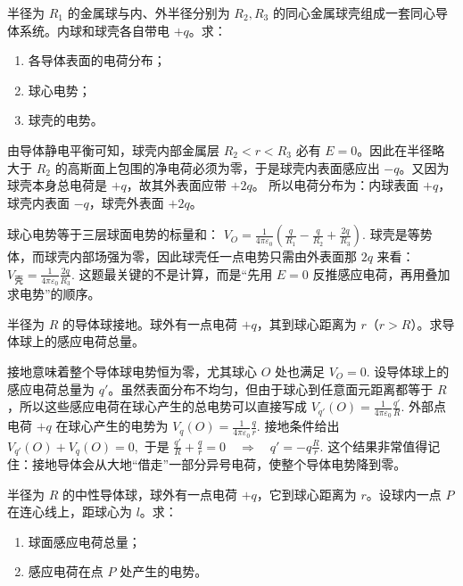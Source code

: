 \documentclass[lang=cn,11pt]{elegantbook}
\begin{document}
\begin{exercise}[同心金属球与金属球壳的电荷分布和电势]
半径为 \(R_1\) 的金属球与内、外半径分别为 \(R_2,R_3\) 的同心金属球壳组成一套同心导体系统。内球和球壳各自带电 \(+q\)。求：
\begin{enumerate}
 \item 各导体表面的电荷分布；
 \item 球心电势；
 \item 球壳的电势。
\end{enumerate}
\end{exercise}

\begin{solution}
由导体静电平衡可知，球壳内部金属层 \(R_2<r<R_3\) 必有 \(E=0\)。因此在半径略大于 \(R_2\) 的高斯面上包围的净电荷必须为零，于是球壳内表面感应出
\(-q\)。又因为球壳本身总电荷是 \(+q\)，故其外表面应带 \(+2q\)。
所以电荷分布为：内球表面 \(+q\)，球壳内表面 \(-q\)，球壳外表面 \(+2q\)。

球心电势等于三层球面电势的标量和：
 \(V_O=\frac{1}{4\pi\varepsilon_0}\left( \frac{q}{R_1}-\frac{q}{R_2}+\frac{2q}{R_3} \right).\) 
球壳是等势体，而球壳内部场强为零，因此球壳任一点电势只需由外表面那 \(2q\) 来看：
 \(V_{\text{壳}}=\frac{1}{4\pi\varepsilon_0}\frac{2q}{R_3}.\) 
这题最关键的不是计算，而是“先用 \(E=0\) 反推感应电荷，再用叠加求电势”的顺序。
\end{solution}

\begin{exercise}[接地导体球附近点电荷诱导出的总电荷]
半径为 \(R\) 的导体球接地。球外有一点电荷 \(+q\)，其到球心距离为 \(r\)（\(r>R\)）。求导体球上的感应电荷总量。
\end{exercise}

\begin{solution}
接地意味着整个导体球电势恒为零，尤其球心 \(O\) 处也满足
 \(V_O=0.\) 
设导体球上的感应电荷总量为 \(q'\)。虽然表面分布不均匀，但由于球心到任意面元距离都等于 \(R\)，所以这些感应电荷在球心产生的总电势可以直接写成
 \(V_{q'}(O)=\frac{1}{4\pi\varepsilon_0}\frac{q'}{R}.\) 
外部点电荷 \(+q\) 在球心产生的电势为
 \(V_q(O)=\frac{1}{4\pi\varepsilon_0}\frac{q}{r}.\) 
接地条件给出
 \(V_{q'}(O)+V_q(O)=0,\) 
于是
 \(\frac{q'}{R}+\frac{q}{r}=0 \quad\Longrightarrow\quad \boxed{q'=-q\frac{R}{r}}.\) 
这个结果非常值得记住：接地导体会从大地“借走”一部分异号电荷，使整个导体电势降到零。
\end{solution}

\begin{exercise}[不接地中性导体球附近点电荷的感应电势]
半径为 \(R\) 的中性导体球，球外有一点电荷 \(+q\)，它到球心距离为 \(r\)。设球内一点 \(P\) 在连心线上，距球心为 \(l\)。求：
\begin{enumerate}
 \item 球面感应电荷总量；
 \item 感应电荷在点 \(P\) 处产生的电势。
\end{enumerate}
\end{exercise}
\end{document}
